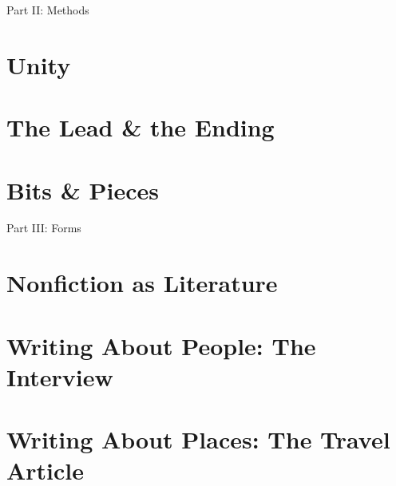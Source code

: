 \documentclass{article}
\begin{document}

\begin{center}\huge
	Part II: Methods
\end{center}


\section{Unity}


\section{The Lead \& the Ending}


\section{Bits \& Pieces}


\begin{center}\huge
	Part III: Forms
\end{center}


\section{Nonfiction as Literature}


\section{Writing About People: The Interview}


\section{Writing About Places: The Travel Article}
\end{document}
